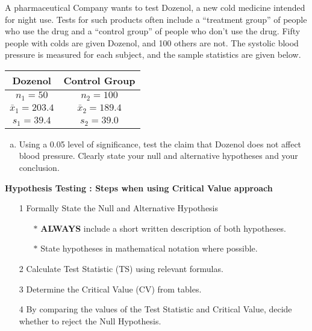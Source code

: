 \documentclass[a4paper,12pt]{article}
\begin{document}
\large 
\noindent A pharmaceutical Company wants to test Dozenol, a new cold medicine intended
for night use. Tests for such products often include a “treatment group” of people
who use the drug and a “control group” of people who don’t use the drug. Fifty
people with colds are given Dozenol, and 100 others are not. The systolic blood
pressure is measured for each subject, and the sample statistics are given below.
\begin{center}
    \begin{tabular}{|c|c|} \hline
Dozenol & Control Group \\ \hline
$n_1 = 50$  & $n_2 = 100 $ \\ \hline
$\bar{x}_1 = 203.4$ & $\bar{x}_2 = 189.4$ \\ \hline
$s_1 = 39.4$  &  $s_2 = 39.0$ \\ \hline
\end{tabular}
\end{center}

\begin{enumerate}[(a)]
    \item Using a 0.05 level of significance, test the claim that Dozenol does not affect blood pressure. Clearly state your null and alternative hypotheses and your conclusion.
\end{enumerate}

\bigskip 

\begin{framed}
\noindent \textbf{Hypothesis Testing : Steps when using Critical Value approach}

\begin{itemize}
\item[1] Formally State the Null and Alternative Hypothesis \smallskip
{
\begin{itemize}
\item[$\ast$] \textbf{ALWAYS} include a short written description of both hypotheses.
\item[$\ast$] State hypotheses in mathematical notation where possible.

\end{itemize}
}
\item[2] Calculate Test Statistic (TS) using relevant formulas.\smallskip
\item[3] Determine the Critical Value (CV) from tables. \smallskip
\item[4] By comparing the values of the Test Statistic and Critical Value, decide whether to reject the Null Hypothesis.
\end{itemize}
\end{framed}
\newpage 
\end{document}

